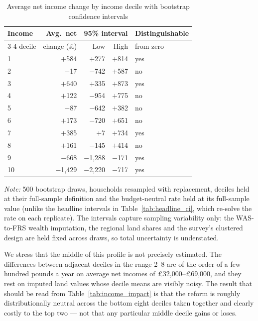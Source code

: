\begin{table}[htbp]
\centering
\caption{Average net income change by income decile with bootstrap confidence intervals}
\label{tab:decile_ci}
\begin{tabular}{lrrrl}
\toprule
Income & Avg.\ net & \multicolumn{2}{c}{95\% interval} & Distinguishable \\
\cmidrule(lr){3-4}
decile & change (\pounds) & Low & High & from zero \\
\midrule
1  & $+$584     & $+$277     & $+$814   & yes \\
2  & $-$17      & $-$742     & $+$587   & no \\
3  & $+$640     & $+$335     & $+$873   & yes \\
4  & $+$122     & $-$954     & $+$775   & no \\
5  & $-$87      & $-$642     & $+$382   & no \\
6  & $+$173     & $-$720     & $+$651   & no \\
7  & $+$385     & $+$7       & $+$734   & yes \\
8  & $+$161     & $-$145     & $+$414   & no \\
9  & $-$668     & $-$1{,}288 & $-$171   & yes \\
10 & $-$1{,}429 & $-$2{,}220 & $-$717   & yes \\
\bottomrule
\end{tabular}

\medskip
{\footnotesize\emph{Note:} 500 bootstrap draws, households resampled with replacement, deciles held at their full-sample definition and the budget-neutral rate held at its full-sample value (unlike the headline intervals in Table~\ref{tab:headline_ci}, which re-solve the rate on each replicate). The intervals capture sampling variability only: the WAS-to-FRS wealth imputation, the regional land shares and the survey's clustered design are held fixed across draws, so total uncertainty is understated.}
\end{table}

We stress that the middle of this profile is not precisely estimated. The differences between adjacent deciles in the range 2--8 are of the order of a few hundred pounds a year on average net incomes of \pounds 32{,}000--\pounds 69{,}000, and they rest on imputed land values whose decile means are visibly noisy. The result that should be read from Table~\ref{tab:income_impact} is that the reform is roughly distributionally neutral across the bottom eight deciles taken together and clearly costly to the top two --- not that any particular middle decile gains or loses.

